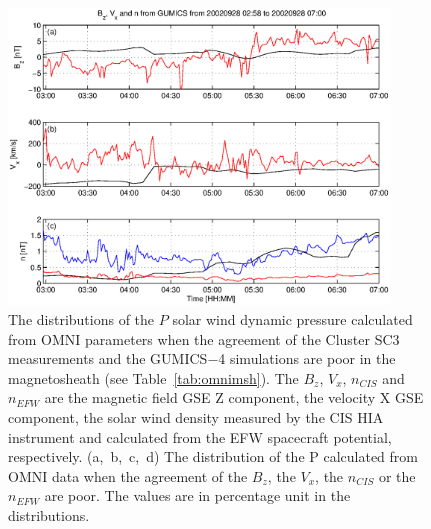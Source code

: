 \documentclass[linenumbers,draft]{agujournal}
\begin{document}
\begin{figure}[h]
\centering
\includegraphics[width=0.9\textwidth,angle=0]{swe-2020-corr-f20.eps}
\caption{The distributions of the $P$ solar wind dynamic pressure calculated from OMNI parameters when the agreement of the Cluster SC3 measurements and the GUMICS$-$4 simulations are poor in the magnetosheath (see Table~\ref{tab:omnimsh}). The $B_{z}$, $V_{x}$, $n_{CIS}$ and $n_{EFW}$ are the magnetic field GSE Z component, the velocity X GSE component, the solar wind density measured by the CIS HIA instrument and calculated from the EFW spacecraft potential, respectively. (a,~b,~c,~d) The distribution of the P calculated from OMNI data when the agreement of the $B_{z}$, the $V_{x}$, the $n_{CIS}$ or the $n_{EFW}$ are poor. The values are in percentage unit in the distributions.}
\label{fig:mshomnip}
\end{figure}

\pagebreak



\pagebreak
\end{document}
